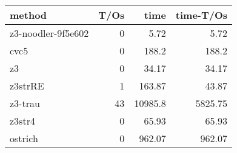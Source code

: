 \begin{tabular}{lrrr}
\hline
 method             &   T/Os &     time &   time-T/Os \\
\hline
 z3-noodler-9f5e602 &      0 &     5.72 &        5.72 \\
 cvc5               &      0 &   188.2  &      188.2  \\
 z3                 &      0 &    34.17 &       34.17 \\
 z3strRE            &      1 &   163.87 &       43.87 \\
 z3-trau            &     43 & 10985.8  &     5825.75 \\
 z3str4             &      0 &    65.93 &       65.93 \\
 ostrich            &      0 &   962.07 &      962.07 \\
\hline
\end{tabular}
